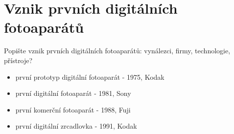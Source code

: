 \section{Vznik prvních digitálních fotoaparátů}
Popište vznik prvních digitálních fotoaparátů: vynálezci, firmy, technologie, přístroje?
\begin{itemize}
    \item první prototyp digitální fotoaparát - 1975, Kodak
    \item první digitální fotoaparát - 1981, Sony 
    \item první komerční fotoaparát - 1988, Fuji
    \item první digitální zrcadlovka - 1991, Kodak
\end{itemize}